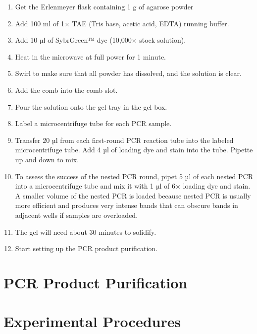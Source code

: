 \documentclass[]{book}
\providecommand{\tightlist}{%
  \setlength{\itemsep}{0pt}\setlength{\parskip}{0pt}}
\begin{document}
\begin{enumerate}
\def\labelenumi{\arabic{enumi}.}
\tightlist
\item
  Get the Erlenmeyer flask containing 1 g of agarose powder
\item
  Add 100 ml of 1× TAE (Tris base, acetic acid, EDTA) running buffer.
\item
  Add 10 µl of SybrGreen™ dye (10,000× stock solution).
\item
  Heat in the microwave at full power for 1 minute.
\item
  Swirl to make sure that all powder has dissolved, and the solution is clear.
\item
  Add the comb into the comb slot.
\item
  Pour the solution onto the gel tray in the gel box.
\item
  Label a microcentrifuge tube for each PCR sample.
\item
  Transfer 20 µl from each first-round PCR reaction tube into the labeled microcentrifuge tube. Add 4 µl of loading dye and stain into the tube. Pipette up and down to mix.
\item
  To assess the success of the nested PCR round, pipet 5 µl of each nested PCR into a microcentrifuge tube and mix it with 1 µl of 6× loading dye and stain. A smaller volume of the nested PCR is loaded because nested PCR is usually more efficient and produces very intense bands that can obscure bands in adjacent wells if samples are overloaded.
\item
  The gel will need about 30 minutes to solidify.
\item
  Start setting up the PCR product purification.
\end{enumerate}

\hypertarget{pcr-product-purification}{%
\section{PCR Product Purification}\label{pcr-product-purification}}

\hypertarget{experimental-procedures-13}{%
\section{Experimental Procedures}\label{experimental-procedures-13}}
\end{document}
